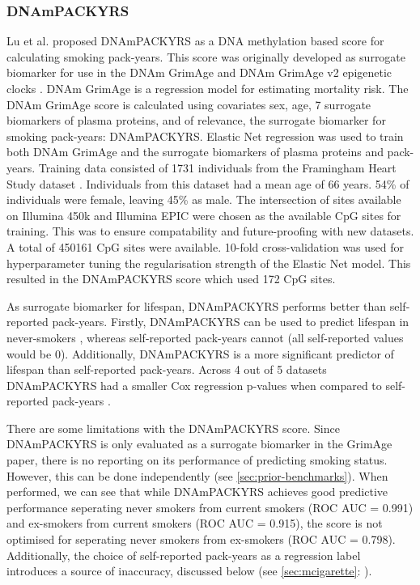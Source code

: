 \documentclass{article}
\begin{document}
\subsubsection{DNAmPACKYRS} \label{sec:dnampackyrs}
Lu et al. \cite{lu2019dna} proposed DNAmPACKYRS as a DNA methylation based score for calculating smoking pack-years. This score was originally developed as surrogate biomarker for use in the DNAm GrimAge and DNAm GrimAge v2 epigenetic clocks \cite{lu2019dna,lu2022dna}. DNAm GrimAge is a regression model for estimating mortality risk. The DNAm GrimAge score is calculated using covariates sex, age, 7 surrogate biomarkers of plasma proteins, and of relevance, the surrogate biomarker for smoking pack-years: DNAmPACKYRS. Elastic Net regression was used to train both DNAm GrimAge and the surrogate biomarkers of plasma proteins and pack-years. Training data consisted of 1731 individuals from the Framingham Heart Study dataset \cite{doi:10.2105/AJPH.41.3.279}. Individuals from this dataset had a mean age of 66 years. 54\% of individuals were female, leaving 45\% as male. The intersection of sites available on Illumina 450k and Illumina EPIC were chosen as the available CpG sites for training. This was to ensure compatability and future-proofing with new datasets. A total of \num{450161} CpG sites were available. 10-fold cross-validation was used for hyperparameter tuning the regularisation strength of the Elastic Net model. This resulted in the DNAmPACKYRS score which used 172 CpG sites.

As surrogate biomarker for lifespan, DNAmPACKYRS performs better than self-reported pack-years. Firstly, DNAmPACKYRS can be used to predict lifespan in never-smokers \cite{lu2019dna}, whereas self-reported pack-years cannot (all self-reported values would be 0). Additionally, DNAmPACKYRS is a more significant predictor of lifespan than self-reported pack-years. Across 4 out of 5 datasets DNAmPACKYRS had a smaller Cox regression p-values when compared to self-reported pack-years \cite{lu2019dna}.

There are some limitations with the DNAmPACKYRS score. Since DNAmPACKYRS is only evaluated as a surrogate biomarker in the GrimAge paper, there is no reporting on its performance of predicting smoking status. However, this can be done independently (see \ref{sec:prior-benchmarks}). When performed, we can see that while DNAmPACKYRS achieves good predictive performance seperating never smokers from current smokers (ROC AUC = 0.991) and ex-smokers from current smokers (ROC AUC = 0.915), the score is not optimised for seperating never smokers from ex-smokers (ROC AUC = 0.798). Additionally, the choice of self-reported pack-years as a regression label introduces a source of inaccuracy, discussed below (see \ref{sec:mcigarette}: ).
\end{document}
